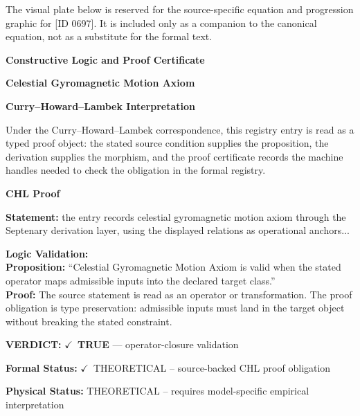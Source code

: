 \begingroup\footnotesize\sloppy
The visual plate below is reserved for the source-specific equation and progression graphic for [ID 0697]. It is included only as a companion to the canonical equation, not as a substitute for the formal text.
\par\endgroup
\ifTZPDarkEdition
{}
\fi

\clearpage
\begingroup\tzpsupportsetup
\noindent\textbf{\fontsize{10.8pt}{12.8pt}\selectfont [ID 0697] Constructive Logic and Proof Certificate}\par
\noindent\textbf{\fontsize{10pt}{12pt}\selectfont Celestial Gyromagnetic Motion Axiom}\par
\vspace{0.45em}
\begingroup
\footnotesize
\setlength{\parskip}{0.22em}
\setlength{\parindent}{0pt}
\noindent\textbf{Curry--Howard--Lambek Interpretation}\par
Under the Curry--Howard--Lambek correspondence, this registry entry is read as a typed proof
object: the stated source condition supplies the proposition, the derivation supplies the
morphism, and the proof certificate records the machine handles needed to check the obligation
in the formal registry.

\vspace{0.45em}
\noindent\textbf{CHL Proof}\par
\textbf{Statement:} the entry records celestial gyromagnetic motion axiom through the Septenary derivation
layer, using the displayed relations as operational anchors...

\textbf{Logic Validation:}\\
\textbf{Proposition:} ``Celestial Gyromagnetic Motion Axiom is valid when the stated operator maps admissible
inputs into the declared target class.''\\
\textbf{Proof:} The source statement is read as an operator or transformation. The proof obligation is
type preservation: admissible inputs must land in the target object without breaking the
stated constraint.

\textbf{VERDICT:} \ensuremath{\checkmark}\ \textbf{TRUE} --- operator-closure validation

\textbf{Formal Status:} \ensuremath{\checkmark}\ THEORETICAL -- source-backed CHL proof obligation

\textbf{Physical Status:} THEORETICAL -- requires model-specific empirical interpretation
\par\vspace{0.45em}
\par
\ifTZPDarkEdition
{}
\fi
\endgroup
\endgroup
